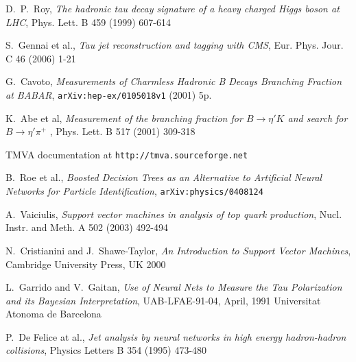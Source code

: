 \documentclass[a4paper]{jpconf}
\begin{document}
\begin{thebibliography}{9}
 D.~P.~Roy, \emph{The hadronic tau decay signature of a heavy charged Higgs
              boson at {LHC}}, Phys. Lett. B 459 (1999) 607-614

 S.~Gennai et al., \emph{Tau jet reconstruction
  and tagging with {CMS}}, Eur. Phys. Jour. C 46 (2006) 1-21

 G.~Cavoto, 
\emph{Measurements of Charmless Hadronic B Decays Branching Fraction at BABAR},
{\tt arXiv:\-hep-ex\-/0105018v1} (2001) 5p.

 K.~Abe et al,
\emph{Measurement of the branching fraction for $B\rightarrow \eta' K$
and search for $B \rightarrow \eta' \pi^{+}$ },
Phys. Lett. B 517 (2001) 309-318

 TMVA documentation at {\tt http://tmva.sourceforge.net}

 B.~Roe et al., \emph{Boosted Decision Trees as an 
Alternative to Artificial Neural Networks for Particle Identification},
{\tt arXiv:\-physics\-/0408124}

 A.~Vaiciulis, \emph{Support vector machines in analysis of top quark production},
Nucl. Instr. and Meth. A 502 (2003) 492-494

N.~Cristianini and J.~Shawe-Taylor, \emph{An Introduction to Support Vector Machines},
Cambridge University Press, UK 2000

 L.~Garrido and V.~Gaitan, 
\emph{Use of Neural Nets to Measure the Tau Polarization and its Bayesian Interpretation},
UAB-LFAE-91-04, April, 1991 Universitat Atonoma de Barcelona


 P.~De Felice at al., 
\emph{Jet analysis by neural networks in high energy hadron-hadron collisions},
Physics Letters B 354 (1995) 473-480



\end{thebibliography}
\end{document}
